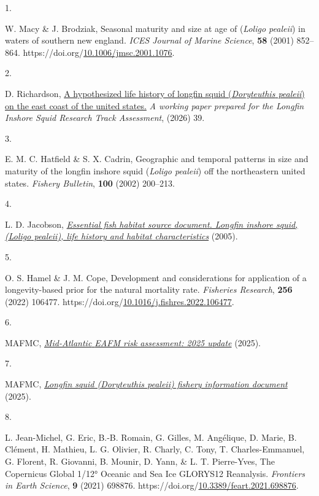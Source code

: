 \documentclass[
  9pt,
  letterpaper,
  DIV=11,
  numbers=noendperiod]{scrartcl}
\newlength{\cslhangindent}
\newlength{\csllabelwidth}
\newenvironment{CSLReferences}[2] %
 {\begin{list}{}{%
  \setlength{\itemindent}{0pt}
  \setlength{\leftmargin}{0pt}
  \setlength{\parsep}{0pt}
  \ifodd #1
   \setlength{\leftmargin}{\cslhangindent}
   \setlength{\itemindent}{-1\cslhangindent}
  \fi
  \setlength{\itemsep}{#2\baselineskip}}}
 {\end{list}}
\newcommand{\CSLLeftMargin}[1]{\parbox[t]{\csllabelwidth}{\strut#1\strut}}
\newcommand{\CSLRightInline}[1]{\parbox[t]{\linewidth - \csllabelwidth}{\strut#1\strut}}
\begin{document}
\label{refs}
\begin{CSLReferences}{0}{0}
\CSLLeftMargin{1. }%
\CSLRightInline{W. Macy \& J. Brodziak, Seasonal maturity and size at
age of (\emph{{Loligo} pealeii}) in waters of southern new england.
\emph{ICES Journal of Marine Science}, \textbf{58} (2001) 852--864.
https://doi.org/\href{https://doi.org/10.1006/jmsc.2001.1076}{10.1006/jmsc.2001.1076}.}

\CSLLeftMargin{2. }%
\CSLRightInline{D. Richardson, \href{}{A hypothesized life history of
longfin squid (\emph{{Doryteuthis} pealeii}) on the east coast of the
united states.} \emph{A working paper prepared for the Longfin Inshore
Squid Research Track Assessment}, (2026) 39.}

\CSLLeftMargin{3. }%
\CSLRightInline{E. M. C. Hatfield \& S. X. Cadrin, Geographic and
temporal patterns in size and maturity of the longfin inshore squid
(\emph{{Loligo} pealeii}) off the northeastern united states.
\emph{Fishery Bulletin}, \textbf{100} (2002) 200--213.}

\CSLLeftMargin{4. }%
\CSLRightInline{L. D. Jacobson,
\emph{\href{https://repository.library.noaa.gov/view/noaa/4035}{Essential
fish habitat source document. Longfin inshore squid, (\emph{{Loligo}
pealeii}), life history and habitat characteristics}} (2005).}

\CSLLeftMargin{5. }%
\CSLRightInline{O. S. Hamel \& J. M. Cope, Development and
considerations for application of a longevity-based prior for the
natural mortality rate. \emph{Fisheries Research}, \textbf{256} (2022)
106477.
https://doi.org/\href{https://doi.org/10.1016/j.fishres.2022.106477}{10.1016/j.fishres.2022.106477}.}

\CSLLeftMargin{6. }%
\CSLRightInline{MAFMC,
\emph{\href{https://static1.squarespace.com/static/511cdc7fe4b00307a2628ac6/t/67d45b1680e8654ecaf1b98e/1741970199497/b_Draft+MAB_RiskAssess_2025.pdf}{Mid-{Atlantic}
{EAFM} risk assessment: 2025 update}} (2025).}

\CSLLeftMargin{7. }%
\CSLRightInline{MAFMC,
\emph{\href{https://static1.squarespace.com/static/511cdc7fe4b00307a2628ac6/t/6806b0eab3a3986a9561ef3c/1745268972731/Longfin-FID_2025-04.pdf}{Longfin
squid (\emph{{Doryteuthis} pealeii}) fishery information document}}
(2025).}

\CSLLeftMargin{8. }%
\CSLRightInline{L. Jean-Michel, G. Eric, B.-B. Romain, G. Gilles, M.
Angélique, D. Marie, B. Clément, H. Mathieu, L. G. Olivier, R. Charly,
C. Tony, T. Charles-Emmanuel, G. Florent, R. Giovanni, B. Mounir, D.
Yann, \& L. T. Pierre-Yves, The {Copernicus} {Global} 1/12° {Oceanic}
and {Sea} {Ice} {GLORYS12} {Reanalysis}. \emph{Frontiers in Earth
Science}, \textbf{9} (2021) 698876.
https://doi.org/\href{https://doi.org/10.3389/feart.2021.698876}{10.3389/feart.2021.698876}.}

\end{CSLReferences}
\end{document}
